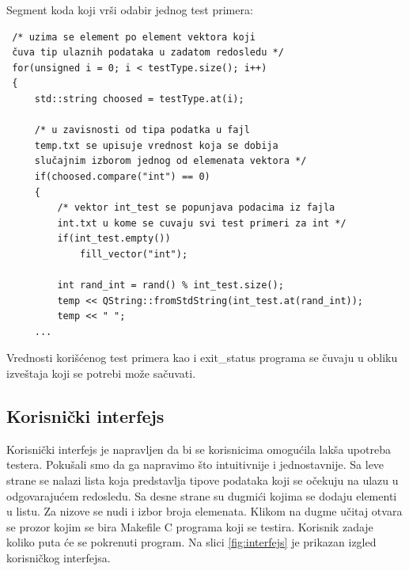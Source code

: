 \documentclass[a4paper]{article}
\begin{document}
{Segment koda koji vrši odabir jednog test primera:
\begin{verbatim}
 /* uzima se element po element vektora koji 
 čuva tip ulaznih podataka u zadatom redosledu */
 for(unsigned i = 0; i < testType.size(); i++)
 {
     std::string choosed = testType.at(i);
     
     /* u zavisnosti od tipa podatka u fajl 
     temp.txt se upisuje vrednost koja se dobija 
     slučajnim izborom jednog od elemenata vektora */
     if(choosed.compare("int") == 0)
     {
         /* vektor int_test se popunjava podacima iz fajla
         int.txt u kome se cuvaju svi test primeri za int */
         if(int_test.empty())
             fill_vector("int"); 
                  
         int rand_int = rand() % int_test.size();
         temp << QString::fromStdString(int_test.at(rand_int));
         temp << " ";
     ...
 \end{verbatim}
 
Vrednosti korišćenog test primera kao i exit\_status programa se čuvaju u obliku izveštaja koji se potrebi može sačuvati.

\subsection{Korisnički interfejs}
\label{subsec:korisnicki_interfejs_testera}

Korisnički interfejs je napravljen da bi se korisnicima omogućila lakša upotreba testera. Pokušali smo da ga napravimo što intuitivnije i jednostavnije. Sa leve strane se nalazi lista koja predstavlja tipove podataka koji se očekuju na ulazu u odgovarajućem redosledu. Sa desne strane su dugmići kojima se dodaju elementi u listu. Za nizove se nudi i izbor broja elemenata. Klikom na dugme učitaj otvara se prozor kojim se bira Makefile C programa koji se testira. Korisnik zadaje koliko puta će se pokrenuti program. Na slici \ref{fig:interfejs} je prikazan izgled korisničkog interfejsa. \\

}
\end{document}
